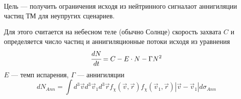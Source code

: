 Цель --- получить ограничения исходя из нейтринного сигналаот аннигиляции частиц ТМ для неупругих сценариев.

Для этого считается на небесном теле (обычно Солнце) скорость захвата
$C$ и определяется число частиц и аннигиляционные потоки исходя из уравнения
\begin{equation*}
	\cfrac{d N}{dt} = C - E \cdot N - \Gamma N^2
\end{equation*}
$E$ --- темп испарения, $\Gamma$ --- аннигиляции
\begin{equation*}
	d N_{Ann} = \int{d^3\vec{v}d^3\vec{v}_1d^3\vec{r}f_{\chi}(\vec{v},\vec{r})f_{\chi}(\vec{v}_1,\vec{r})|\vec{v}-\vec{v}_1|d\sigma_{Ann}}
\end{equation*}


